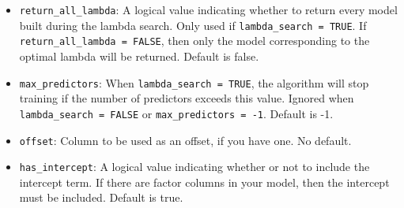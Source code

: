 \documentclass[11pt]{article}
\begin{document}
\begin{itemize}
\item \texttt{return\_all\_lambda}: A logical value indicating whether to return every model built during the lambda search. Only used if \texttt{lambda\_search = TRUE}. If \texttt{return\_all\_lambda = FALSE}, then only the model corresponding to the optimal lambda will be returned. Default is false.
\item \texttt{max\_predictors}: When \texttt{lambda\_search = TRUE}, the algorithm will stop training if the number of predictors exceeds this value. Ignored when \texttt{ lambda\_search = FALSE} or \texttt{max\_predictors = -1}. Default is -1.
\item \texttt{offset}: Column to be used as an offset, if you have one. No default.
\item \texttt{has\_intercept}: A logical value indicating whether or not to include the intercept term. If there are factor columns in your model, then the intercept must be included. Default is true.
\end{itemize}





\newpage
\end{document}
